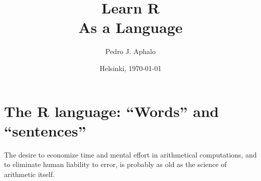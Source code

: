 \documentclass[krantz2]{krantz}\usepackage{knitr}
\begin{document}

\title{\Huge{\sffamily Learn R\\{\Large As a Language}}}

\author{Pedro J. Aphalo}

\date{Helsinki, \today}


















\frontmatter

\maketitle

\newpage

\setcounter{page}{5} %
\tableofcontents
\listoffigures



%
%



\mainmatter







\chapter{The R language: ``Words'' and ``sentences''}\label{chap:R:as:calc}

\begin{VF}
The desire to economize time and mental effort in arithmetical computations, and to eliminate human liability to error, is probably as old as the science of arithmetic itself.

\nocite{Aiken1964}
\end{VF}

\end{document}
